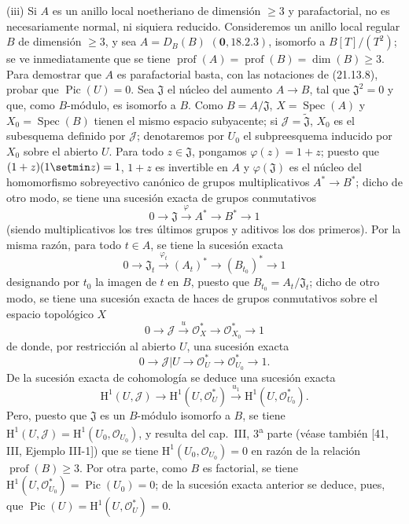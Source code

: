 \begin{env}[21.13.9]
(iii) Si $A$ es un anillo local noetheriano de dimensión $\geq3$ y parafactorial, no
es necesariamente normal, ni siquiera reducido. Consideremos un anillo local regular
$B$ de dimensión $\geq3$, y sea $A=D_B(B)$ $(\mathbf 0, 18.2.3)$, isomorfo a
$B[T]/(T^2)$; se ve inmediatamente que se tiene
$\operatorname{prof}(A)=\operatorname{prof}(B)=\dim(B)\geq3$. Para demostrar que $A$
es parafactorial basta, con las notaciones de (21.13.8), probar que
$\operatorname{Pic}(U)=0$. Sea $\mathfrak J$ el núcleo del aumento $A\to B$,
tal que $\mathfrak J^2=0$ y que, como $B$-módulo, es isomorfo a $B$.
Como $B=A/\mathfrak J$, $X=\operatorname{Spec}(A)$ y
$X_0=\operatorname{Spec}(B)$ tienen el mismo espacio subyacente; si
$\mathscr J=\widetilde{\mathfrak J}$, $X_0$ es el subesquema definido por
$\mathscr J$; denotaremos por $U_0$ el subpreesquema inducido por $X_0$ sobre el abierto
$U$. Para todo $z\in\mathfrak J$, pongamos $\varphi(z)=1+z$; puesto que
$(1+z)(1\setmin z)=1$, $1+z$ es invertible en $A$ y $\varphi(\mathfrak J)$ es el núcleo
del homomorfismo sobreyectivo canónico de grupos multiplicativos $A^*\to B^*$; dicho
de otro modo, se tiene una sucesión exacta de grupos conmutativos
\[
  0\longrightarrow\mathfrak J\xrightarrow{\varphi}A^*\longrightarrow B^*
  \longrightarrow1
\]
(siendo multiplicativos los tres últimos grupos y aditivos los dos primeros). Por la
misma razón, para todo $t\in A$, se tiene la sucesión exacta
\[
  0\longrightarrow\mathfrak J_t\xrightarrow{\varphi_t}(A_t)^*
  \longrightarrow(B_{t_0})^*\longrightarrow1
\]
designando por $t_0$ la imagen de $t$ en $B$, puesto que
$B_{t_0}=A_t/\mathfrak J_t$; dicho de otro modo, se tiene una sucesión exacta de haces de
grupos conmutativos sobre el espacio topológico $X$
\[
  0\longrightarrow\mathscr J\xrightarrow{u}\mathcal O_X^*
  \longrightarrow\mathcal O_{X_0}^*\longrightarrow1
\]
de donde, por restricción al abierto $U$, una sucesión exacta
\[
  0\longrightarrow\mathscr J|U\longrightarrow\mathcal O_U^*
  \longrightarrow\mathcal O_{U_0}^*\longrightarrow1.
\]
De la sucesión exacta de cohomología se deduce una sucesión exacta
\[
\label{IV.21.13.9.1}
  \mathrm H^1(U,\mathscr J)\longrightarrow\mathrm H^1(U,\mathcal O_U^*)
  \xrightarrow{u_1}\mathrm H^1(U,\mathcal O_{U_0}^*).
  \tag{21.13.9.1}
\]
Pero, puesto que $\mathfrak J$ es un $B$-módulo isomorfo a $B$, se tiene
$\mathrm H^1(U,\mathscr J)=\mathrm H^1(U_0,\mathcal O_{U_0})$, y resulta del
cap.~III, 3\textsuperscript{a} parte (véase también [41, III, Ejemplo III-1]) que se tiene
$\mathrm H^1(U_0,\mathcal O_{U_0})=0$ en razón de la relación
$\operatorname{prof}(B)\geq3$. Por otra parte, como $B$ es factorial, se tiene
$\mathrm H^1(U,\mathcal O_{U_0}^*)=\operatorname{Pic}(U_0)=0$; de la
sucesión exacta anterior se deduce, pues, que
$\operatorname{Pic}(U)=\mathrm H^1(U,\mathcal O_U^*)=0$.


\end{env}
